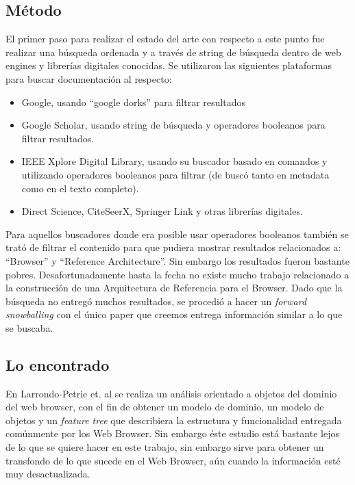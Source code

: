
\subsection*{Método}
El primer paso para realizar el estado del arte con respecto a este punto fue realizar una búsqueda ordenada y a través de string de búsqueda dentro de web engines y librerías digitales conocidas. Se utilizaron las siguientes plataformas para buscar documentación al respecto:
\begin{itemize}
    \item Google, usando ``google dorks'' para filtrar resultados
    \item Google Scholar, usando string de búsqueda y operadores booleanos para filtrar resultados.
    \item IEEE Xplore Digital Library, usando su buscador basado en comandos y utilizando operadores booleanos para filtrar (de buscó tanto en metadata como en el texto completo).
    \item Direct Science, CiteSeerX, Springer Link y otras librerías digitales. 
\end{itemize}

Para aquellos buscadores donde era posible usar operadores booleanos también se trató de filtrar el contenido para que pudiera mostrar resultados relacionados a: ``Browser'' y ``Reference Architecture''. Sin embargo los resultados fueron bastante pobres. Desafortunadamente hasta la fecha no existe mucho trabajo relacionado a la construcción de una Arquitectura de Referencia para el Browser. Dado que la búsqueda no entregó muchos resultados, se procedió a hacer un \textit{forward snowballing} con el único paper que creemos entrega información similar a lo que se buscaba.

\subsection*{Lo encontrado}
En Larrondo-Petrie et. al \cite{535061} se realiza un análisis orientado a objetos del dominio del web browser, con el fin de obtener un modelo de dominio, un modelo de objetos y un \textit{feature tree} que describiera la estructura y funcionalidad entregada comúnmente por los Web Browser. Sin embargo éste estudio está bastante lejos de lo que se quiere hacer en este trabajo, sin embargo sirve para obtener un transfondo de lo que sucede en el Web Browser, aún cuando la información esté muy desactualizada.

